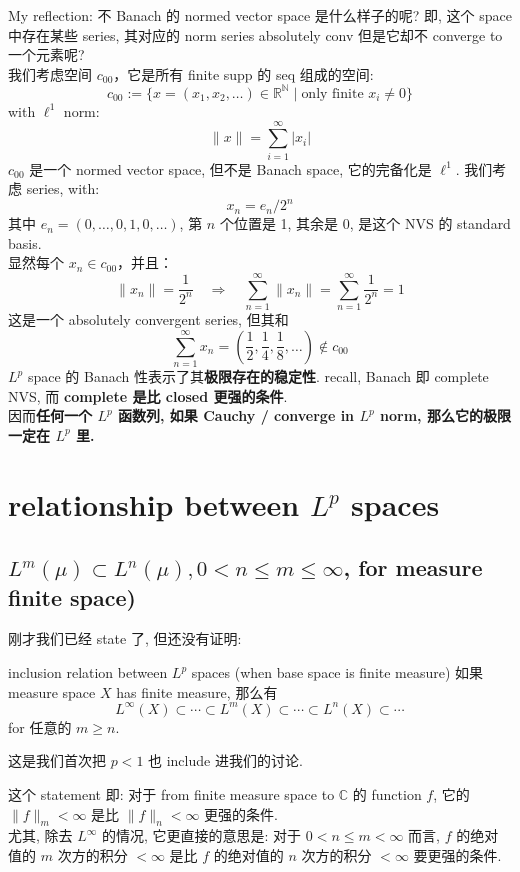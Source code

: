 \documentclass[lang=cn,11pt]{elegantbook}
\begin{document}
\begin{remark}
My reflection: 不 Banach 的 normed vector space 是什么样子的呢? 即, 这个 space 中存在某些 series, 其对应的 norm series absolutely conv 但是它却不 converge to 一个元素呢? \\
我们考虑空间 \( c_{00} \)，它是所有 finite supp 的 seq 组成的空间:
\[ c_{00} := \{ x = (x_1, x_2, \dots) \in \mathbb{R}^\mathbb{N} \mid \text{only finite } x_i \neq 0 \}
\]
with \( \ell^1 \) norm: \[
\|x\| = \sum_{i=1}^\infty |x_i|
\]
 \( c_{00} \) 是一个 normed vector space, 但不是 Banach space, 它的完备化是 \( \ell^1 \).
我们考虑 series, with: \[
x_n = e_n / 2^n
\]
其中 \( e_n = (0, \dots, 0, 1, 0, \dots) \), 第 \( n \) 个位置是 1, 其余是 $0$, 是这个 NVS 的 standard basis.\\
显然每个 \( x_n \in c_{00} \)，并且： \[
\|x_n\| = \frac{1}{2^n} \quad \Rightarrow \quad \sum_{n=1}^\infty \|x_n\| = \sum_{n=1}^\infty \frac{1}{2^n} = 1
\]这是一个 absolutely convergent series,  但其和
\[
\sum_{n=1}^\infty x_n = \left(\frac{1}{2}, \frac{1}{4}, \frac{1}{8}, \dots\right) \notin c_{00}
\]
$L^p$ space 的 Banach 性表示了其\textbf{极限存在的稳定性}. recall, Banach 即 complete NVS, 而 \textbf{complete 是比 closed 更强的条件}. \\
因而\textbf{任何一个 $L^p$ 函数列, 如果 Cauchy / converge in $L^p$ norm, 那么它的极限一定在 $L^p$ 里.}
\end{remark}



\section{relationship between $L^p$ spaces}

\subsection{$L^{m}(\mu) \subset L^{n}(\mu), 0 < n\leq m\leq \infty$, for measure finite space)}
刚才我们已经 state 了, 但还没有证明: 
\begin{theorem}{ inclusion relation between $L^p$ spaces (when base space is finite measure)}
    如果 measure space $X$ has finite measure, 那么有 \[
    L^\infty(X) \subset \cdots \subset L^m(X)\subset \cdots  \subset L^{n} (X)\subset \cdots 
    \]
for 任意的 $m \geq n$.
\end{theorem}
这是我们首次把 $p<1$ 也 include 进我们的讨论.

这个 statement 即: 对于 from finite measure space to $\mathbb{C}$ 的 function $f$, 它的 $\|f\|_m< \infty$ 是比 $\|f\|_n<\infty$ 更强的条件. \\
尤其, 除去 $L^\infty$ 的情况, 它更直接的意思是: 对于 $0 <  n \leq m <\infty$ 而言, $f$ 的绝对值的 $m$ 次方的积分 $<\infty $ 是比 $f$ 的绝对值的 $n$ 次方的积分 $<\infty$ 要更强的条件. 
\end{document}
